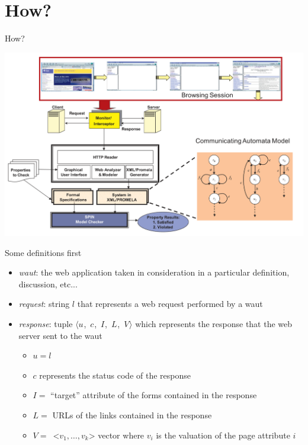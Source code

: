 \documentclass[usenames,dvipsnames]{beamer}
\newcommand{\res}[1][]{
  \ifthenelse{\equal{#1}{}}{\mbox{$\langle u$, $c$, $I$, $L$, $V\rangle$}}
  {\mbox{$\langle u_{#1}$, $c_{#1}$, $I_{#1}$, $L_{#1}$, $V_{#1}\rangle$}}
}
\theoremstyle{definition}
\begin{document}
\section{How?}
\begin{frame}{How?}

  \includegraphics[width=\textwidth]{../img/general_architecture.png}
\end{frame}

\begin{frame}{Some definitions first}
  \begin{itemize}
    \item \textit{\gls{waut}}: the web application taken in consideration in a particular definition, discussion, etc...
    \item \textit{request}: string $l$ that represents a web request performed by a \gls{waut}
    \item \textit{response}: tuple \res which represents the response that the web server sent to the \gls{waut}
      \begin{itemize}
        \item $u = l$
        \item $c$ represents the status code of the response \cite{Fielding2022}
        \item $I =$ ``target'' attribute of the forms contained in the response
        \item $L =$ URLs of the links contained in the response
        \item $V =$\ <$v_1,\dots,v_k$> vector where $v_i$ is the valuation of the page attribute $i$
      \end{itemize}
  \end{itemize}
\end{frame}
\end{document}
